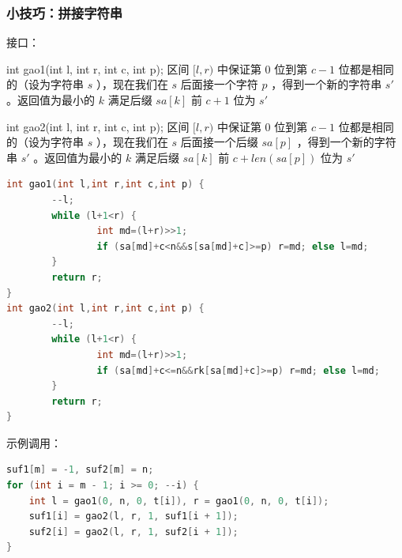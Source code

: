 \documentclass{article}
\begin{document}
\subsubsection{小技巧：拼接字符串}
接口： 

int gao1(int l, int r, int c, int p); 区间 $[l, r)$ 中保证第 $0$ 位到第 $c - 1$ 位都是相同的（设为字符串 $s$ ），现在我们在 $s$ 后面接一个字符 $p$ ，得到一个新的字符串 $s'$ 。返回值为最小的 $k$ 满足后缀 $sa[k]$ 前 $c + 1$ 位为 $s'$ 

int gao2(int l, int r, int c, int p); 区间 $[l, r)$ 中保证第 $0$ 位到第 $c - 1$ 位都是相同的（设为字符串 $s$ ），现在我们在 $s$ 后面接一个后缀 $sa[p]$ ，得到一个新的字符串 $s'$ 。返回值为最小的 $k$ 满足后缀 $sa[k]$ 前 $c + len(sa[p])$ 位为 $s'$ 

\begin{lstlisting}[language=C++]
int gao1(int l,int r,int c,int p) {
        --l;
        while (l+1<r) {
                int md=(l+r)>>1;
                if (sa[md]+c<n&&s[sa[md]+c]>=p) r=md; else l=md;
        }
        return r;
}
int gao2(int l,int r,int c,int p) {
        --l;
        while (l+1<r) {
                int md=(l+r)>>1;
                if (sa[md]+c<=n&&rk[sa[md]+c]>=p) r=md; else l=md;
        }
        return r;
}
\end{lstlisting}
示例调用：
\begin{lstlisting}[language=C++]
suf1[m] = -1, suf2[m] = n;
for (int i = m - 1; i >= 0; --i) {
	int l = gao1(0, n, 0, t[i]), r = gao1(0, n, 0, t[i]);
	suf1[i] = gao2(l, r, 1, suf1[i + 1]);
	suf2[i] = gao2(l, r, 1, suf2[i + 1]);
}
\end{lstlisting}
\end{document}
